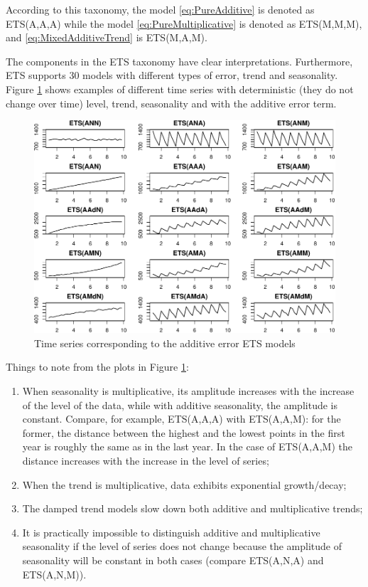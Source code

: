 \documentclass[]{book}
\providecommand{\tightlist}{%
  \setlength{\itemsep}{0pt}\setlength{\parskip}{0pt}}
\theoremstyle{definition}
\theoremstyle{definition}
\theoremstyle{definition}
\theoremstyle{definition}
\theoremstyle{remark}
\begin{document}
According to this taxonomy, the model \eqref{eq:PureAdditive} is denoted as ETS(A,A,A) while the model \eqref{eq:PureMultiplicative} is denoted as ETS(M,M,M), and \eqref{eq:MixedAdditiveTrend} is ETS(M,A,M).

The components in the ETS taxonomy have clear interpretations. Furthermore, ETS supports 30 models with different types of error, trend and seasonality. Figure \ref{fig:ETSTaxonomyAdditive} shows examples of different time series with deterministic (they do not change over time) level, trend, seasonality and with the additive error term.

\begin{figure}
\centering
\includegraphics{Svetunkov--2022----ADAM_files/figure-latex/ETSTaxonomyAdditive-1.pdf}
\caption{\label{fig:ETSTaxonomyAdditive}Time series corresponding to the additive error ETS models}
\end{figure}

Things to note from the plots in Figure \ref{fig:ETSTaxonomyAdditive}:

\begin{enumerate}
\def\labelenumi{\arabic{enumi}.}
\tightlist
\item
  When seasonality is multiplicative, its amplitude increases with the increase of the level of the data, while with additive seasonality, the amplitude is constant. Compare, for example, ETS(A,A,A) with ETS(A,A,M): for the former, the distance between the highest and the lowest points in the first year is roughly the same as in the last year. In the case of ETS(A,A,M) the distance increases with the increase in the level of series;
\item
  When the trend is multiplicative, data exhibits exponential growth/decay;
\item
  The damped trend models slow down both additive and multiplicative trends;
\item
  It is practically impossible to distinguish additive and multiplicative seasonality if the level of series does not change because the amplitude of seasonality will be constant in both cases (compare ETS(A,N,A) and ETS(A,N,M)).
\end{enumerate}
\end{document}
